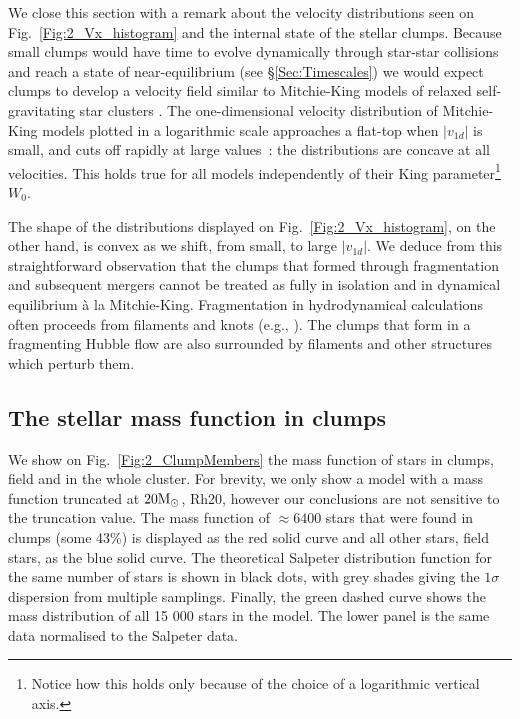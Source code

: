 We close this section with a remark about the velocity distributions seen on Fig.~\ref{Fig:2_Vx_histogram} and the internal state of the stellar clumps. Because small clumps would have time to evolve dynamically through star-star collisions and reach a state of near-equilibrium (see \S\ref{Sec:Timescales}) we would expect clumps to develop a velocity field similar to Mitchie-King models of  relaxed self-gravitating star clusters \citep{BT}.  The one-dimensional velocity distribution of Mitchie-King models plotted in a logarithmic scale approaches a flat-top when $|v_{1d}|$ is small,  and cuts off rapidly at large values~: the distributions are  concave at all velocities. This holds true for all models independently of their King parameter\footnote{Notice how this holds only because of the choice of a logarithmic vertical axis.} $W_0$. 

The shape of the distributions displayed on Fig.~\ref{Fig:2_Vx_histogram}, on the other hand, is convex as we shift, from small, to large $|v_{1d}|$. We deduce from this straightforward observation that the clumps that formed through fragmentation and subsequent mergers cannot be treated as fully in isolation and in dynamical equilibrium \`a la Mitchie-King.  Fragmentation in hydrodynamical calculations often proceeds from filaments and knots  (e.g., \citealt{Klessen2001,MacLow2004,Maschberger2010,Bate2014}). The clumps that form in a fragmenting  Hubble  flow are also surrounded by filaments and other structures which perturb them.




\subsection{The stellar mass function in clumps} 



We show on Fig.~\ref{Fig:2_ClumpMembers} the mass function of stars in clumps, field and in the whole cluster. For brevity, we only show a model with a mass function truncated at $20 {\textrm{M}_\odot}$, Rh20,  however our conclusions are not sensitive to the truncation value. The mass function of $\approx 6400$ stars that were found in clumps (some 43\%) is displayed as the red solid curve and all other stars, field stars, as the blue solid curve. The theoretical Salpeter distribution function for the same number of stars is shown in black dots, with grey shades giving the  $1 \sigma$ dispersion from multiple samplings. Finally, the green dashed curve  shows the mass distribution of all 15 000 stars in the model. The lower panel is the same data normalised to the Salpeter data. 

